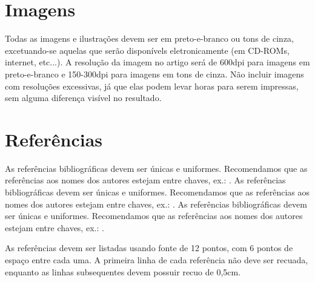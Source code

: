 \documentclass[11.5pt]{article}
\begin{document}
\section{Imagens}

Todas as imagens e ilustrações devem ser em preto-e-branco ou tons de cinza, excetuando-se aquelas que serão disponívels eletronicamente (em CD-ROMs, internet, etc...). A resolução da imagem no artigo será de 600dpi para imagens em preto-e-branco e 150-300dpi para imagens em tons de cinza. Não incluir imagens com resoluções excessivas, já que elas podem levar horas para serem impressas, sem alguma diferença visível no resultado.

\section{Referências}

As referências bibliográficas devem ser únicas e uniformes. Recomendamos que as referências aos nomes dos autores estejam entre chaves, ex.: \cite{knuth:84}.
As referências bibliográficas devem ser únicas e uniformes. Recomendamos que as referências aos nomes dos autores estejam entre chaves, ex.: \cite{boulic:91}.
As referências bibliográficas devem ser únicas e uniformes. Recomendamos que as referências aos nomes dos autores estejam entre chaves, ex.: \cite{smith:99}.

As referências devem ser listadas usando fonte de 12 pontos, com 6 pontos de espaço entre cada uma. A primeira linha de cada referência não deve ser recuada, enquanto as linhas subsequentes devem possuir recuo de 0,5cm.



\end{document}
